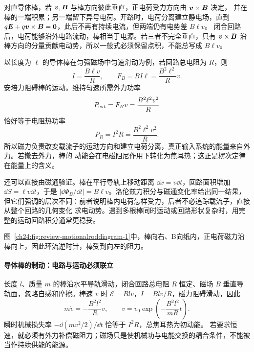 {对直导体棒，若 $\bm{v},\bm{B}$ 与棒方向彼此垂直，正电荷受力方向由 $\bm{v}\times\bm{B}$ 决定，
并在棒的一端积累；另一端留下异号电荷。开路时，电荷分离建立静电场，直到
$q\bm{E}+q\bm{v}\times\bm{B}=\bm{0}$，此后不再有持续电流，但两端仍有电势差 $B\ell v$。
闭合回路后，电荷能够沿外电路流动，棒相当于电源。若三者不完全垂直，只有
$\bm{v}\times\bm{B}$ 沿棒方向的分量贡献电动势，所以一般式必须保留点积，不能总写成 $B\ell v$。

以长度为 $\ell$ 的导体棒在匀强磁场中匀速滑动为例，若回路总电阻为 $R$，则
\begin{equation}
  I=\frac{B\ell v}{R},\qquad
  F_B=BI\ell=\frac{B^2\ell^2}{R}v.
\end{equation}
安培力阻碍棒的运动。维持匀速所需外力功率
\begin{equation}
  P_{\rm ext}=F_Bv=\frac{B^2\ell^2v^2}{R}
\end{equation}
恰好等于电阻热功率
\begin{equation}
  P_R=I^2R=\frac{B^2\ell^2v^2}{R}.
\end{equation}
所以磁力负责改变载流子的运动方向和建立电荷分离，真正输入系统的能量来自外力。若撤去外力，棒的
动能会在电磁阻尼作用下转化为焦耳热；这正是楞次定律在能量上的含义。

还可以直接由磁通验证。棒在平行导轨上移动距离 $\dd x=v\dd t$，回路面积增加
$\dd S=\ell v\dd t$，于是 $|\dd\Phi_B/\dd t|=B\ell v$。洛伦兹力积分与磁通变化率给出同一结果，
但它们强调的层次不同：前者说明棒内电荷怎样受力，后者不必追踪载流子，直接从整个回路的几何变化
求电动势。遇到多根棒同时运动或回路形状复杂时，用完整的运动回路积分通常更稳妥。

图~\ref{ch24:fig:review-motionalroddiagram-1}中，棒向右、B向纸内，正电荷磁力沿棒向上，因此环流逆时针，棒受到向左的阻力。
\par\noindent\begin{minipage}{\linewidth}
\motionalRodDiagram
{}
\end{minipage}\par\medskip


\paragraph{导体棒的制动：电路与运动必须联立}
长度 $l$、质量 $m$ 的棒沿水平导轨滑动，闭合回路总电阻 $R$ 恒定、磁场 $B$ 垂直导轨面，忽略自感和摩擦。棒速 $v$ 时
$\mathcal E=Blv$，$I=Blv/R$，磁力阻碍滑动，因此
\[
 m\dot v=-\frac{B^2l^2}{R}v,\qquad
 v=v_0\exp\left(-\frac{B^2l^2}{mR}t\right).
\]
瞬时机械损失率 $-\dd(mv^2/2)/\dd t$ 恰等于 $I^2R$，总焦耳热为初动能。
若要求恒速，就必须有外力补偿磁阻力；磁场只是使机械功与电能交换的耦合条件，不能被当作持续供能的能源。


}
